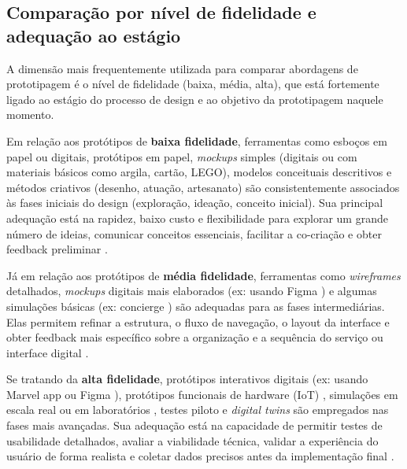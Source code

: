 \subsection{Comparação por nível de fidelidade e adequação ao estágio}

A dimensão mais frequentemente utilizada para comparar abordagens de prototipagem é o nível de fidelidade (baixa, média, alta), que está fortemente ligado ao estágio do processo de design e ao objetivo da prototipagem naquele momento.

Em relação aos protótipos de \textbf{baixa fidelidade}, ferramentas como esboços em papel ou digitais, protótipos em papel, \textit{mockups} simples (digitais ou com materiais básicos como argila, cartão, LEGO), modelos conceituais descritivos e métodos criativos (desenho, atuação, artesanato) são consistentemente associados às fases iniciais do design (exploração, ideação, conceito inicial). Sua principal adequação está na rapidez, baixo custo e flexibilidade para explorar um grande número de ideias, comunicar conceitos essenciais, facilitar a co-criação e obter feedback preliminar \cite{paust2025integrative, mager2023product, Vieira2025, asbjornsen2022echange, kumar2023rheumatology, lee2023industry, seko2024transitions, soto2023prototyping, villa2022integratedcare, Suryawati2024, wang2023smartproducts}.

Já em relação aos protótipos de \textbf{média fidelidade}, ferramentas como \textit{wireframes} detalhados, \textit{mockups} digitais mais elaborados (ex: usando Figma \cite{villa2022integratedcare}) e algumas simulações básicas (ex: concierge \cite{Suryawati2024}) são adequadas para as fases intermediárias. Elas permitem refinar a estrutura, o fluxo de navegação, o layout da interface e obter feedback mais específico sobre a organização e a sequência do serviço ou interface digital \cite{villa2022integratedcare, Suryawati2024, nguyen2022human}.

Se tratando da \textbf{alta fidelidade}, protótipos interativos digitais (ex: usando Marvel app \cite{asbjornsen2022echange} ou Figma \cite{villa2022integratedcare}), protótipos funcionais de hardware (IoT) \cite{Kim2024}, simulações em escala real ou em laboratórios \cite{seko2024transitions, soto2023prototyping, yan2022pssvalue}, testes piloto \cite{seko2024transitions} e \textit{digital twins} \cite{mager2023product} são empregados nas fases mais avançadas. Sua adequação está na capacidade de permitir testes de usabilidade detalhados, avaliar a viabilidade técnica, validar a experiência do usuário de forma realista e coletar dados precisos antes da implementação final \cite{paust2025integrative, asbjornsen2022echange, mager2023product, villa2022integratedcare, Kim2024}.

